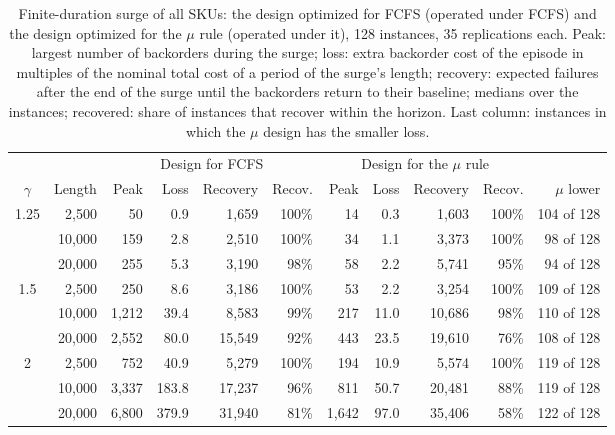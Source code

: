 \begin{table}[!htb]
\centering
\caption{Finite-duration surge of all SKUs: the design optimized for FCFS (operated under FCFS) and the design optimized for the $\mu$ rule (operated under it), 128 instances, 35 replications each. Peak: largest number of backorders during the surge; loss: extra backorder cost of the episode in multiples of the nominal total cost of a period of the surge's length; recovery: expected failures after the end of the surge until the backorders return to their baseline; medians over the instances; recovered: share of instances that recover within the horizon. Last column: instances in which the $\mu$ design has the smaller loss.}
\label{tab:surge_all}
\small
\setlength{\tabcolsep}{4pt}
\begin{tabular}{@{}cr rrrr rrrr r@{}}
\toprule
& & \multicolumn{4}{c}{Design for FCFS} & \multicolumn{4}{c}{Design for the $\mu$ rule} & \\
\cmidrule(lr){3-6}\cmidrule(lr){7-10}
$\gamma$ & Length & Peak & Loss & Recovery & Recov. & Peak & Loss & Recovery & Recov. & $\mu$ lower \\
\midrule
1.25 & 2,500 & 50 & 0.9 & 1,659 & 100\% & 14 & 0.3 & 1,603 & 100\% & 104 of 128 \\
 & 10,000 & 159 & 2.8 & 2,510 & 100\% & 34 & 1.1 & 3,373 & 100\% & 98 of 128 \\
 & 20,000 & 255 & 5.3 & 3,190 & 98\% & 58 & 2.2 & 5,741 & 95\% & 94 of 128 \\
\midrule
1.5 & 2,500 & 250 & 8.6 & 3,186 & 100\% & 53 & 2.2 & 3,254 & 100\% & 109 of 128 \\
 & 10,000 & 1,212 & 39.4 & 8,583 & 99\% & 217 & 11.0 & 10,686 & 98\% & 110 of 128 \\
 & 20,000 & 2,552 & 80.0 & 15,549 & 92\% & 443 & 23.5 & 19,610 & 76\% & 108 of 128 \\
\midrule
2 & 2,500 & 752 & 40.9 & 5,279 & 100\% & 194 & 10.9 & 5,574 & 100\% & 119 of 128 \\
 & 10,000 & 3,337 & 183.8 & 17,237 & 96\% & 811 & 50.7 & 20,481 & 88\% & 119 of 128 \\
 & 20,000 & 6,800 & 379.9 & 31,940 & 81\% & 1,642 & 97.0 & 35,406 & 58\% & 122 of 128 \\
\bottomrule
\end{tabular}
\end{table}
